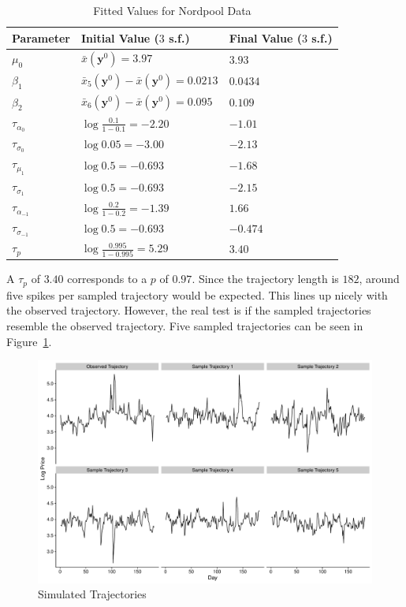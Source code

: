 \begin{table}[H]
\caption{Fitted Values for Nordpool Data}
\label{tab:fitted-nordpool}
\begin{tabular}{@{}lll@{}}
\toprule
Parameter & Initial Value ($3$ s.f.) & Final Value ($3$ s.f.) \\ \midrule
$\mu_0$   & $\bar{x}(\pmb{y}^0) = 3.97$ & $3.93$ \\
$\beta_1$ & $\bar{x}_5(\pmb{y}^0) - \bar{x}(\pmb{y}^0) = 0.0213$ & $0.0434$ \\
$\beta_2$ & $\bar{x}_6(\pmb{y}^0) - \bar{x}(\pmb{y}^0) = 0.095$ & $0.109$\\
$\tau_{\alpha_0}$ & $\log{\frac{0.1}{1-0.1}} = -2.20$ & $-1.01$ \\
$\tau_{\sigma_0}$ & $\log{0.05} = -3.00$ & $-2.13$ \\
$\tau_{\mu_1}$ & $\log{0.5} = -0.693$ & $-1.68$\\
$\tau_{\sigma_1}$ & $\log{0.5} = -0.693$ & $-2.15$ \\
$\tau_{\alpha_{-1}}$ & $\log{\frac{0.2}{1-0.2}} = -1.39$ & $1.66$ \\
$\tau_{\sigma_{-1}}$ & $\log{0.5} = -0.693$ & $-0.474$ \\
$\tau_{p}$ & $\log{\frac{0.995}{1-0.995}} = 5.29$ & $3.40$ \\ \bottomrule
\end{tabular}
\end{table}

A $\tau_{p}$ of $3.40$ corresponds to a $p$ of $0.97$. Since the trajectory length is $182$, around five spikes per sampled trajectory would be expected. This lines up nicely with the observed trajectory. However, the real test is if the sampled trajectories resemble the observed trajectory. Five sampled trajectories can be seen in Figure~\ref{fig:sim-traj}.

\begin{figure}[H]
        \centering
        \includegraphics[width=12cm]{images/fitting/full_model/sim_traj.pdf}
        \caption{Simulated Trajectories}
        \label{fig:sim-traj}
\end{figure}


